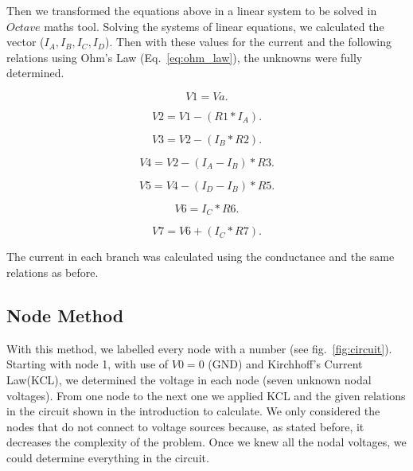 Then we transformed the equations above in a linear system to be solved in $Octave$ maths tool. Solving the systems of linear equations, we calculated the vector ($I_A,I_B,I_C,I_D$). Then with these values for the current and the following relations using Ohm’s Law (Eq.~\ref{eq:ohm_law}), the unknowns were fully determined.

\begin{equation}
  V1 = Va.
  \label{eq:v1}
\end{equation}

\begin{equation}
  V2 = V1 - (R1*I_A).
  \label{eq:v2}
\end{equation}

\begin{equation}
  V3 = V2 - (I_B*R2).
  \label{eq:v3}
\end{equation}

\begin{equation}
  V4 = V2 - (I_A-I_B)*R3.
  \label{eq:v4}
\end{equation}

\begin{equation}
  V5 = V4 - (I_D-I_B)*R5.
  \label{eq:v5}
\end{equation}

\begin{equation}
  V6 = I_C*R6.
  \label{eq:v6}
\end{equation}

\begin{equation}
  V7 = V6 + (I_C*R7).
  \label{eq:v7}
\end{equation}

The current in each branch was calculated using the conductance and the same relations as before.

\subsection{Node Method}

With this method, we labelled every node with a number (see fig.~\ref{fig:circuit}). Starting with node 1, with use of $V0=0$ (GND) and Kirchhoff’s Current Law(KCL), we determined the voltage in each node (seven unknown nodal voltages). From one node to the next one we applied KCL and the given relations in the circuit shown in the introduction to calculate. We only considered the nodes that do not connect to voltage sources because, as stated before, it decreases the complexity of the problem. Once we knew all the nodal voltages, we could determine everything in the circuit.

